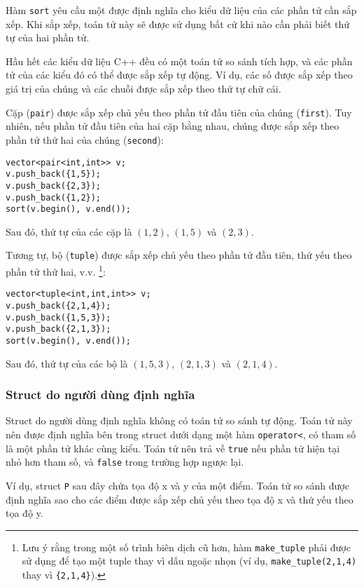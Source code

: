 Hàm \texttt{sort} yêu cầu
một  được định nghĩa cho kiểu dữ liệu
của các phần tử cần sắp xếp.
Khi sắp xếp, toán tử này sẽ được sử dụng
bất cứ khi nào cần phải biết thứ tự của hai phần tử.

Hầu hết các kiểu dữ liệu C++ đều có một toán tử so sánh tích hợp,
và các phần tử của các kiểu đó có thể được sắp xếp tự động.
Ví dụ, các số được sắp xếp theo giá trị của chúng
và các chuỗi được sắp xếp theo thứ tự chữ cái.


Cặp (\texttt{pair}) được sắp xếp chủ yếu theo
phần tử đầu tiên của chúng (\texttt{first}).
Tuy nhiên, nếu phần tử đầu tiên của hai cặp bằng nhau,
chúng được sắp xếp theo phần tử thứ hai của chúng (\texttt{second}):
\begin{lstlisting}
vector<pair<int,int>> v;
v.push_back({1,5});
v.push_back({2,3});
v.push_back({1,2});
sort(v.begin(), v.end());
\end{lstlisting}
Sau đó, thứ tự của các cặp là
$(1,2)$, $(1,5)$ và $(2,3)$.


Tương tự, bộ (\texttt{tuple})
được sắp xếp chủ yếu theo phần tử đầu tiên,
thứ yếu theo phần tử thứ hai, v.v.
\footnote{Lưu ý rằng trong một số trình biên dịch cũ hơn,
hàm \texttt{make\_tuple} phải được sử dụng để tạo một tuple thay vì
dấu ngoặc nhọn (ví dụ, \texttt{make\_tuple(2,1,4)} thay vì \texttt{\{2,1,4\}}).}:
\begin{lstlisting}
vector<tuple<int,int,int>> v;
v.push_back({2,1,4});
v.push_back({1,5,3});
v.push_back({2,1,3});
sort(v.begin(), v.end());
\end{lstlisting}
Sau đó, thứ tự của các bộ là
$(1,5,3)$, $(2,1,3)$ và $(2,1,4)$.

\subsubsection{Struct do người dùng định nghĩa}

Struct do người dùng định nghĩa không có toán tử
so sánh tự động.
Toán tử này nên được định nghĩa bên trong
struct dưới dạng một hàm
\texttt{operator<},
có tham số là một phần tử khác cùng kiểu.
Toán tử nên trả về \texttt{true}
nếu phần tử hiện tại nhỏ hơn tham số,
và \texttt{false} trong trường hợp ngược lại.

Ví dụ, struct \texttt{P} sau đây
chứa tọa độ x và y của một điểm.
Toán tử so sánh được định nghĩa sao cho
các điểm được sắp xếp chủ yếu theo tọa độ x
và thứ yếu theo tọa độ y.

